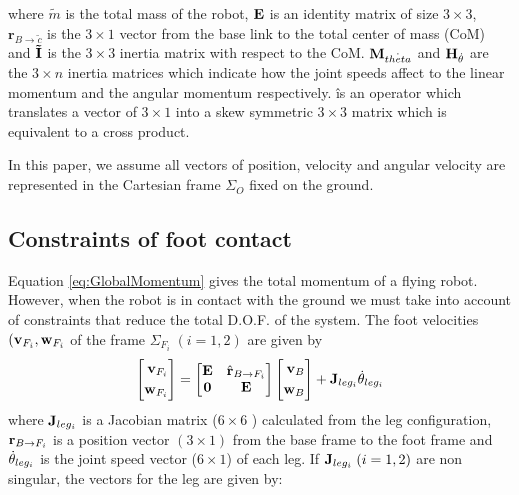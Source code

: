 where $\tilde{m}$ is the total mass of the robot, ${\bf E}$ is an identity matrix of size $3 \times 3$,
$\textbf{r}_{B \rightarrow \tilde{c}}$ is the $3 \times 1$ vector from the base link to the
total center of mass (CoM) and ${\bf \tilde{I}}$ is the $3 \times 3$ inertia matrix with respect
to the CoM. ${\bf M}_{\dot{theta}}$ and ${\bf H}_{\dot{\theta}}$ are the $3 \times n$ inertia
matrices which indicate how the joint speeds affect to the linear momentum and the angular
momentum respectively. \^ is an operator which translates a vector of $3 \times 1$  into
a skew symmetric $3 \times 3$ matrix which is equivalent to a cross product.
\par
In this paper, we assume all vectors of position, velocity and angular velocity
are represented in the Cartesian frame $\Sigma_O$ fixed on the ground.

\subsection{Constraints of foot contact}
Equation \ref{eq:GlobalMomentum} gives the total momentum of a flying robot.
However, when the robot is in contact with the ground we must take into account of constraints
that reduce the total D.O.F. of the system.
The foot velocities $({\bf v}_{F_i}, {\bf w}_{F_i}$ of the frame $\Sigma_{F_i} \; (i=1,2)$ are
given by
\begin{equation}
\left[
\begin{aligned}
{\bf v}_{F_i} \\
{\bf w}_{F_i}\\
\end{aligned}
\right]
=
\left[
\begin{matrix}
{\bf E} & \hat{\bf r}_{B \rightarrow F_i} \\
{\bf 0} & {\bf E}\\
\end{matrix}
\right]
\left[
\begin{aligned}
{\bf v}_{B} \\
{\bf w}_{B}\\
\end{aligned}
\right]
+
{\bf J}_{leg_i} \dot{\bf \theta}_{leg_i}
\end{equation}
where ${\bf J}_{leg_i}$ is a Jacobian matrix ($ 6 \times 6$ ) calculated from the leg configuration,
${\bf r}_{B \rightarrow F_i}$ is a position vector $(3 \times 1 )$ from the base frame to the foot
frame and $\dot{\bf \theta}_{leg_i}$ is the joint speed vector ($ 6 \times 1 $) of each leg.
If ${\bf J}_{leg_i} \; (i=1,2)$  are non singular, the vectors for the leg are given by:

